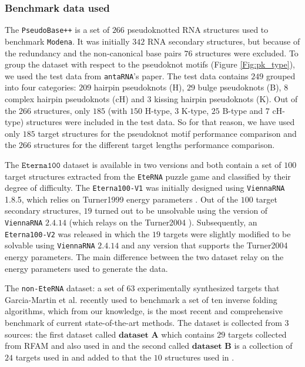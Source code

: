 \subsubsection{Benchmark data used}
The \texttt{PseudoBase++} is a set of $266$ pseudoknotted RNA structures used to benchmark \texttt{Modena}. It was initially $342$ RNA secondary structures, but because of the redundancy and the non-canonical base pairs  $76$ structures were excluded. To group the dataset with respect to the pseudoknot motifs (Figure \ref{Fig:pk_type}), we used the test data from \texttt{antaRNA}'s paper. The test data contains $249$ grouped into four categories: $209$ hairpin pseudoknots (H), $29$ bulge pseudoknots (B), $8$ complex hairpin pseudoknots (cH) and $3$ kissing hairpin pseudoknots (K). Out of the $266$ structures, only $185$ (with $150$ H-type, $3$ K-type, $25$ B-type and $7$ cH-type) structures were included in the test data. So for that reason, we have used only $185$ target structures for the pseudoknot motif performance comparison and the $266$ structures for the different target lengths performance comparison.

The \(\texttt{Eterna100}\) dataset \cite{Eterna} is available in two versions and both contain a set of \(100\) target structures extracted from the \texttt{EteRNA} puzzle game and classified by their degree of difficulty. The \texttt{Eterna100-V1} was initially designed using \texttt{ViennaRNA} 1.8.5, which relies on Turner1999 energy parameters \cite{Turn1999}. Out of the $100$ target secondary structures, $19$ turned out to be unsolvable using the version of \texttt{ViennaRNA} $2.4.14$ (which relays on the Turner2004 \cite{mathews2004incorporating}). Subsequently, an \texttt{Eterna100-V2} \cite{Eterna} was released in which the $19$ targets were slightly modified to be solvable using \texttt{ViennaRNA} $2.4.14$ and any version that supports the Turner2004 energy parameters. The main difference between the two dataset relay on the energy parameters used to generate the data.

The \texttt{non-EteRNA} dataset: a set of \(63\) experimentally synthesized targets that Garcia-Martin et al. \cite{garcia2013rnaifold} recently used to benchmark a set of ten inverse folding algorithms, which from our knowledge, is the most recent and comprehensive benchmark of current state-of-the-art methods. The dataset is collected from \(3\) sources: the first dataset called \(\textbf{dataset A}\) which contains \(29\) targets collected from RFAM and also used in \cite{esmaili2015erd,taneda2011modena} and the second called \(\textbf{dataset B}\) is a collection of \(24\) targets used in \cite{esmaili2015erd} and added to that the \(10\) structures used in \cite{shi2018sentrna}.

